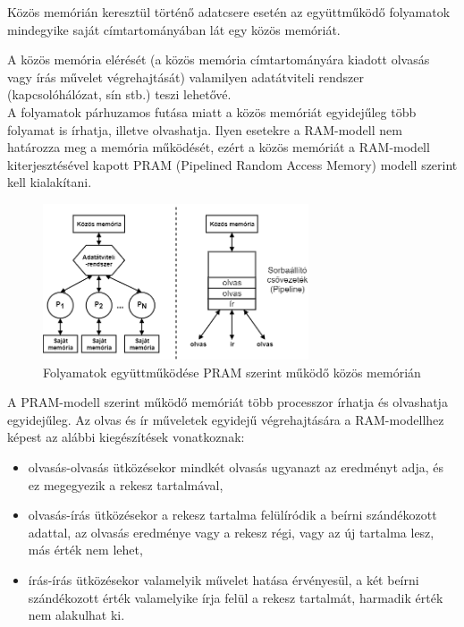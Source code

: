 \documentclass[tikz,12pt,margin=0px]{article}
\begin{document}
    \noindent Közös memórián keresztül történő adatcsere esetén az együttműködő folyamatok mindegyike saját címtartományában lát egy közös memóriát.

    \noindent A közös memória elérését (a közös memória címtartományára kiadott olvasás vagy írás művelet végrehajtását) valamilyen adatátviteli rendszer (kapcsolóhálózat, sín stb.) teszi lehetővé.\\

    \noindent A folyamatok párhuzamos futása miatt a közös memóriát egyidejűleg több folyamat is írhatja, illetve olvashatja. Ilyen esetekre a RAM-modell nem határozza meg a memória működését, ezért a közös memóriát a RAM-modell kiterjesztésével kapott PRAM (Pipelined Random Access Memory) modell szerint kell kialakítani.\\

    \begin{figure}[H]
        \centering
        \includegraphics[width=0.7\textwidth]{img/shared_memory_sync.png}
        \caption{Folyamatok együttműködése PRAM szerint működő közös memórián}
        \label{shared_memory_sync}
    \end{figure}

    \noindent A PRAM-modell szerint működő memóriát több processzor írhatja és olvashatja egyidejűleg. Az olvas és ír műveletek egyidejű végrehajtására a RAM-modellhez képest az alábbi kiegészítések vonatkoznak:
    \begin{itemize}
        \item olvasás-olvasás ütközésekor mindkét olvasás ugyanazt az eredményt adja, és ez megegyezik a rekesz tartalmával,

        \item olvasás-írás ütközésekor a rekesz tartalma felülíródik a beírni szándékozott adattal, az olvasás eredménye vagy a rekesz régi, vagy az új tartalma lesz, más érték nem lehet,

        \item írás-írás ütközésekor valamelyik művelet hatása érvényesül, a két beírni szándékozott érték valamelyike írja felül a rekesz tartalmát, harmadik érték nem alakulhat ki.
    \end{itemize}
\end{document}
